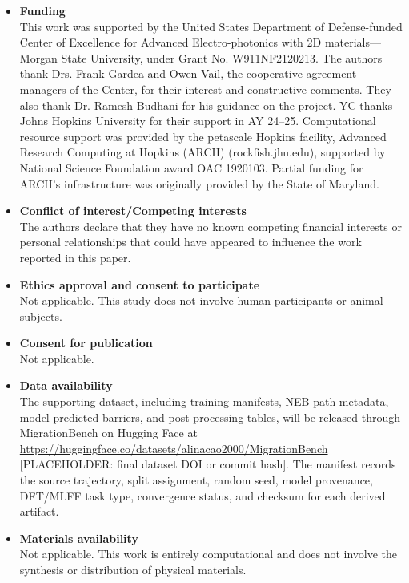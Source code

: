 \documentclass[pdflatex,sn-mathphys-num]{sn-jnl}%
\theoremstyle{thmstyleone}%
\theoremstyle{thmstyletwo}%
\theoremstyle{thmstylethree}%
\begin{document}
\begin{itemize}
  \item \textbf{Funding} \\
This work was supported by the United States Department of Defense-funded Center of Excellence for Advanced Electro-photonics with 2D materials—Morgan State University, under Grant No. W911NF2120213. The authors thank Drs. Frank Gardea and Owen Vail, the cooperative agreement managers of the Center, for their interest and constructive comments. They also thank Dr. Ramesh Budhani for his guidance on the project.
YC thanks Johns Hopkins University for their support in AY 24–25. Computational resource support was provided by the petascale Hopkins facility, Advanced Research Computing at Hopkins (ARCH) (rockfish.jhu.edu), supported by National Science Foundation award OAC 1920103. Partial funding for ARCH’s infrastructure was originally provided by the State of Maryland.

  \item \textbf{Conflict of interest/Competing interests} \\
  The authors declare that they have no known competing financial interests or personal relationships that could have appeared to influence the work reported in this paper.

  \item \textbf{Ethics approval and consent to participate} \\
  Not applicable. This study does not involve human participants or animal subjects.

  \item \textbf{Consent for publication} \\
  Not applicable.

  \item \textbf{Data availability} \\
  The supporting dataset, including training manifests, NEB path metadata, model-predicted barriers, and post-processing tables, will be released through MigrationBench on Hugging Face at \url{https://huggingface.co/datasets/alinacao2000/MigrationBench} [PLACEHOLDER: final dataset DOI or commit hash]. The manifest records the source trajectory, split assignment, random seed, model provenance, DFT/MLFF task type, convergence status, and checksum for each derived artifact.

  \item \textbf{Materials availability} \\
  Not applicable. This work is entirely computational and does not involve the synthesis or distribution of physical materials.


\end{itemize}
\end{document}
